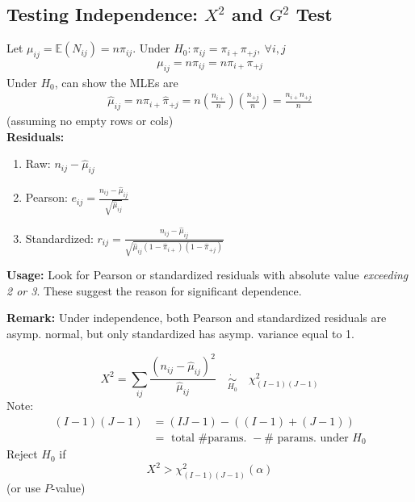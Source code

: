 \documentclass[11pt]{elegantbook}
\begin{document}
\subsection{Testing Independence: $X^2$ and $G^2$ Test}
Let $\mu_{ij}=\mathbb{E}(N_{ij})=n\pi_{ij}$. Under $H_0:\pi_{ij}=\pi_{i+}\pi_{+j},\ \forall i,j$
\begin{equation}
    \begin{aligned}
        \mu_{ij}=n\pi_{ij}=n\pi_{i+}\pi_{+j}
    \end{aligned}
    \nonumber
\end{equation}
Under $H_0$, can show the MLEs are
\begin{equation}
    \begin{aligned}
        \hat{\mu}_{ij}=n\hat{\pi}_{i+}\hat{\pi}_{+j}=n\left(\frac{n_{i+}}{n}\right)\left(\frac{n_{+j}}{n}\right)=\frac{n_{i+}n_{+j}}{n}
    \end{aligned}
    \nonumber
\end{equation}
(assuming no empty rows or cols)\\
\textbf{Residuals:}
\begin{enumerate}
    \item Raw: $n_{ij}-\hat{\mu}_{ij}$
    \item Pearson: $e_{ij}=\frac{n_{ij}-\hat{\mu}_{ij}}{\sqrt{\hat{\mu}_{ij}}}$
    \item Standardized: $r_{ij}=\frac{n_{ij}-\hat{\mu}_{ij}}{\sqrt{\hat{\mu}_{ij}(1-\hat{\pi}_{i+})(1-\hat{\pi}_{+j})}}$
\end{enumerate}
\textbf{Usage:} Look for Pearson or standardized residuals with absolute value \textit{exceeding 2 or 3}. These suggest the reason for significant dependence.

\textbf{Remark:} Under independence, both Pearson and standardized residuals are asymp. normal, but only standardized has asymp. variance equal to 1.

\begin{definition}
    $$X^2=\sum_{i j} \frac{\left(n_{i j}-\hat{\mu}_{i j}\right)^2}{\hat{\mu}_{i j}} \quad \underset{H_0}{\dot{\sim}}\quad \chi_{(I-1)(J-1)}^2$$
    Note:
    $$
    \begin{aligned}
    (I-1)(J-1) & =(I J-1)-((I-1)+(J-1)) \\
    & =\text { total \# params. }-\# \text { params. under } H_0
    \end{aligned}
    $$
    Reject $H_0$ if
    $$
    X^2>\chi_{(I-1)(J-1)}^2(\alpha)
    $$
    (or use $P$-value)
\end{definition}
\end{document}
